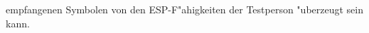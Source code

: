 \begin{loesung}
\begin{teilaufgaben}
empfangenen Symbolen von den ESP-F"ahigkeiten der Testperson
"uberzeugt sein kann.
\end{teilaufgaben}
\end{loesung}
